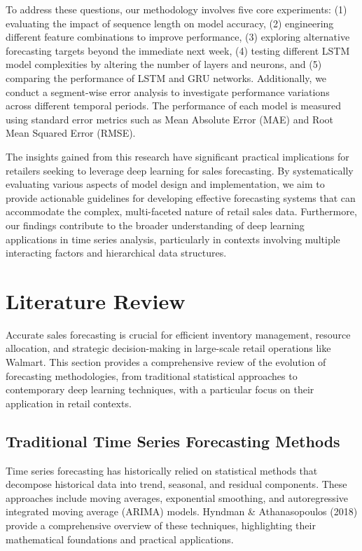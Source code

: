 \documentclass[conference]{IEEEtran}
\begin{document}
To address these questions, our methodology involves five core experiments: (1) evaluating the impact of sequence length on model accuracy, (2) engineering different feature combinations to improve performance, (3) exploring alternative forecasting targets beyond the immediate next week, (4) testing different LSTM model complexities by altering the number of layers and neurons, and (5) comparing the performance of LSTM and GRU networks. Additionally, we conduct a segment-wise error analysis to investigate performance variations across different temporal periods. The performance of each model is measured using standard error metrics such as Mean Absolute Error (MAE) and Root Mean Squared Error (RMSE).

The insights gained from this research have significant practical implications for retailers seeking to leverage deep learning for sales forecasting. By systematically evaluating various aspects of model design and implementation, we aim to provide actionable guidelines for developing effective forecasting systems that can accommodate the complex, multi-faceted nature of retail sales data. Furthermore, our findings contribute to the broader understanding of deep learning applications in time series analysis, particularly in contexts involving multiple interacting factors and hierarchical data structures.

\section{Literature Review}
Accurate sales forecasting is crucial for efficient inventory management, resource allocation, and strategic decision-making in large-scale retail operations like Walmart. This section provides a comprehensive review of the evolution of forecasting methodologies, from traditional statistical approaches to contemporary deep learning techniques, with a particular focus on their application in retail contexts.

\subsection{Traditional Time Series Forecasting Methods}
Time series forecasting has historically relied on statistical methods that decompose historical data into trend, seasonal, and residual components. These approaches include moving averages, exponential smoothing, and autoregressive integrated moving average (ARIMA) models. Hyndman \& Athanasopoulos (2018) provide a comprehensive overview of these techniques, highlighting their mathematical foundations and practical applications.
\end{document}
